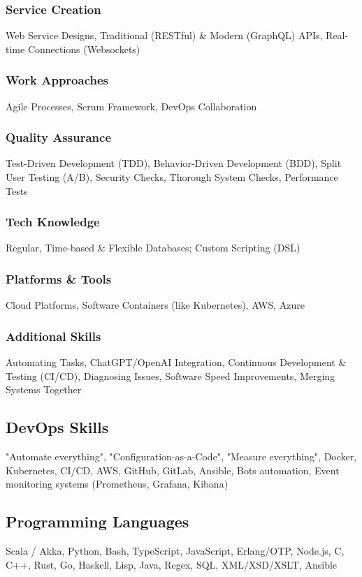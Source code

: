 \subsubsection*{Service Creation}
Web Service Designs, Traditional (RESTful) \& Modern (GraphQL) APIs, Real-time Connections (Websockets)

\subsubsection*{Work Approaches}
Agile Processes, Scrum Framework, DevOps Collaboration

\subsubsection*{Quality Assurance}
Test-Driven Development (TDD), Behavior-Driven Development (BDD), Split User Testing (A/B), Security Checks, Thorough System Checks, Performance Tests

\subsubsection*{Tech Knowledge}
Regular, Time-based \& Flexible Databases; Custom Scripting (DSL)

\subsubsection*{Platforms \& Tools}
Cloud Platforms, Software Containers (like Kubernetes), AWS, Azure

\subsubsection*{Additional Skills}
Automating Tasks, ChatGPT/OpenAI Integration, Continuous Development \& Testing (CI/CD), Diagnosing Issues, Software Speed Improvements, Merging Systems Together

\subsection*{DevOps Skills}
"Automate everything", "Configuration-as-a-Code", "Measure everything", Docker, Kubernetes, CI/CD, AWS, GitHub, GitLab, Ansible, Bots automation, Event monitoring systems (Prometheus, Grafana, Kibana)

\subsection*{Programming Languages}
Scala / Akka, Python, Bash, TypeScript, JavaScript, Erlang/OTP, Node.js, C, C++, Rust, Go, Haskell, Lisp, Java, Regex, SQL, XML/XSD/XSLT, Ansible

